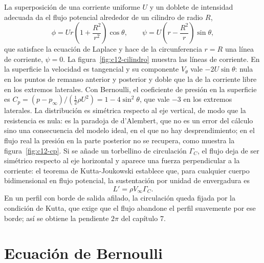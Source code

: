 \documentclass[10pt,openany]{book}
\begin{document}
La superposición de una corriente uniforme \(U\) y un doblete de intensidad adecuada da el flujo potencial alrededor de un cilindro de radio \(R\),
\begin{equation}
\phi = U r\left(1 + \frac{R^{2}}{r^{2}}\right)\cos\theta, \qquad \psi = U\left(r - \frac{R^{2}}{r}\right)\sin\theta, \label{eq:c12-cilindro}
\end{equation}
que satisface la ecuación de Laplace y hace de la circunferencia \(r = R\) una línea de corriente, \(\psi = 0\). La figura~\ref{fig:c12-cilindro} muestra las líneas de corriente. En la superficie la velocidad es tangencial y su componente \(V_\theta\) vale \(-2U\sin\theta\): nula en los puntos de remanso anterior y posterior y doble que la de la corriente libre en los extremos laterales. Con Bernoulli, el coeficiente de presión en la superficie es \(C_p = (p - p_\infty)/(\tfrac12\rho U^{2}) = 1 - 4\sin^{2}\theta\), que vale \(-3\) en los extremos laterales. La distribución es simétrica respecto al eje vertical, de modo que la resistencia es nula: es la paradoja de d'Alembert, que no es un error del cálculo sino una consecuencia del modelo ideal, en el que no hay desprendimiento; en el flujo real la presión en la parte posterior no se recupera, como muestra la figura~\ref{fig:c12-cp}. Si se añade un torbellino de circulación \(\Gamma_C\), el flujo deja de ser simétrico respecto al eje horizontal y aparece una fuerza perpendicular a la corriente: el teorema de Kutta-Joukowski establece que, para cualquier cuerpo bidimensional en flujo potencial, la sustentación por unidad de envergadura es
\begin{equation}
L' = \rho V_\infty\Gamma_C. \label{eq:c12-kutta}
\end{equation}
En un perfil con borde de salida afilado, la circulación queda fijada por la condición de Kutta, que exige que el flujo abandone el perfil suavemente por ese borde; así se obtiene la pendiente \(2\pi\) del capítulo 7.

\section{Ecuación de Bernoulli}
\end{document}
